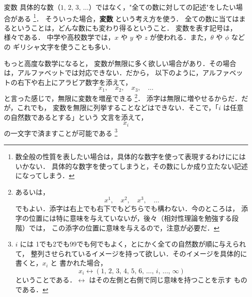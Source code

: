         \begin{mysmallsec}{変数}
            具体的な数（$1,\,2,\,3,\,\ldots$）ではなく，"全ての数に対しての記述"をしたい場合がある
                \footnote{
                    数全般の性質を表したい場合は，具体的な数字を使って表現するわけににはいかない．
                    具体的な数字を使ってしまうと，その数にしか成り立たない記述になってしまう．
                }．
            そういった場合，\textbf{変数} という考え方を使う．
            全ての数に当てはまるということは，どんな数にも変わり得るということ．
            変数を表す記号は，様々である．
            中学や高校数学では，$x$ や $y$ や $z$ が使われる．また，$\theta$ や $\phi$ などの
            ギリシャ文字を使うことも多い．

            もっと高度な数学になると，
            変数が無限に多く欲しい場合があり．その場合は，アルファベットでは対応できない．だから，
            以下のように，アルファベットの右下や右上にアラビア数字を添えて，
                \begin{equation*}
                    {x}_{1} , \quad {x}_{2} , \quad {x}_{3} , \quad \ldots
                \end{equation*}
            と言った感じで，無限に変数を増産できる
                \footnote{
                    あるいは，
                    \begin{equation*}
                        {x}^{1} , \quad {x}^{2} , \quad {x}^{3} , \quad \ldots
                    \end{equation*}
                    でもよい．添字は右上でも右下でもどちらでも構わない．今のところは，
                    添字の位置には特に意味を与えていないが，後々（相対性理論を勉強する段階）では，
                    この添字の位置に意味を与えるので，注意が必要だ．
                }．
            添字は無限に増やせるからだ．だが，これでも，
            変数を無限に列挙することなどはできない．そこで，「$i$ は任意の自然数であるとする」という
            文言を添えて，
                \begin{equation*}
                    {x}_{i}
                \end{equation*}
            の一文字で済ますことが可能である
                \footnote{
                    $i$ には 1でも2でも99でも何でもよく，とにかく全ての自然数が順に与えられて，
                    整列させられているイメージを持って欲しい．そのイメージを具体的に書くと，${x}_{i}$ と
                    書かれた場合，
                    \begin{equation*}
                        {x}_{i}
                        \leftrightarrow
                        \left( 1,\,2,\,3,\,4,\,5,\,6,\,\ldots,\,i,\,\ldots,\,\infty \right)
                    \end{equation*}
                    ということである．$\leftrightarrow$ はその左側と右側で同じ意味を持つことを示す
                    ものである．

}
\end{mysmallsec}
